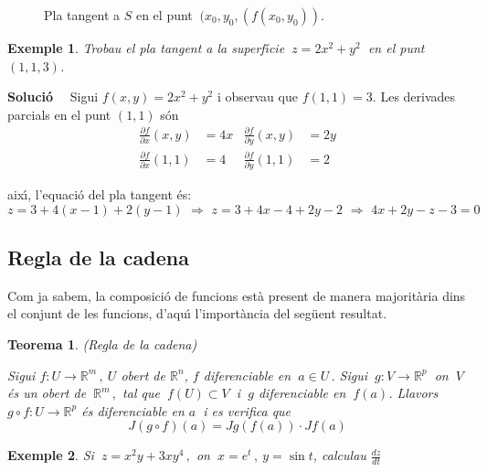 \documentclass[12pt]{article}
\newcommand{\solucio}{\textbf{Soluci{\'o}}\ \ }
\newtheorem{teorema}{Teorema}[subsection]
\newtheorem{exemple}{Exemple}[subsection]
\newcommand{\R}{\mathbb{R}}
\begin{document}
\vspace{0.4cm}
\begin{figure}[h]
\begin{center}

\end{center}\caption{Pla tangent a $S$ en el punt $\ (x_0,y_0,(f(x_0,y_0))$.}\label{dfdv3}
\end{figure}

\vspace{0.4cm}
\begin{exemple}
Trobau el pla tangent a la superf{\'\i}cie $\ z=2x^{2}+y^{2}\ $ en el punt $(1,1,3)$.
\end{exemple}

\solucio
Sigui $f(x,y)=2x^{2}+y^{2}$ i observau que $f(1,1)=3$. Les derivades parcials en el punt $(1,1)$ s{\'o}n
\begin{align*}
\frac{\partial f}{\partial x}(x,y) & =4x & \frac{\partial
f}{\partial y}(x,y) & =2y \\ \frac{\partial f}{\partial x}(1,1) &
=4 & \frac{\partial f}{\partial y}(1,1) & =2
\end{align*}

aix{\'\i}, l'equaci{\'o} del pla tangent {\'e}s:
\vspace{0.4cm}\begin{equation*}
z = 3+4(x-1)+2(y-1) \,\, \Longrightarrow  \, \, z=3+4x-4+2y-2 \,\,
\Longrightarrow  \, \, 4x+2y-z-3=0
\end{equation*}

\subsection{Regla de la cadena}
Com ja sabem, la composici{\'o} de funcions est{\`a} present de manera majorit{\`a}ria dins el conjunt de les funcions, d'aqu{\'\i} l'import{\`a}ncia del seg{\"u}ent resultat.

\vspace{0.4cm}
\begin{teorema} (Regla de la cadena)

Sigui  $f:U \longrightarrow
\R^m\,,\ U$ obert de $\R^n$, $f$ diferenciable en $\ a \in U\,.$ Sigui $\ g:V
\longrightarrow \R^p\ $ on $\ V\ $ {\'e}s un obert de $\ \R^m\,, $ tal que $\ f(U)
\subset V\ $ i $\ g$ diferenciable en $\ f(a)$. Llavors $g\circ
f:U \longrightarrow \R^p$ {\'e}s diferenciable en $a\ $ i es verifica que
\[
J(g\circ f)(a) = Jg(f(a)) \cdot Jf(a)
\]
\end{teorema}


\vspace{0.4cm}
\begin{exemple}
Si $\ z=x^2y+3xy^4\,,$ on $\ x=e^t\,,\ y=\sin t$, calculau
$\displaystyle\frac{dz}{dt}$
\end{exemple}
\end{document}
